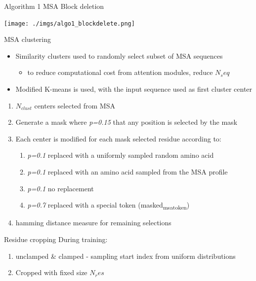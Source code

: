 \documentclass[presentation, smaller]{beamer}
\begin{document}
\begin{frame}[label={sec:org2d4be19}]{Algorithm 1 MSA Block deletion \cite{jumperHighlyAccurateProtein2021}}
\begin{center}
\texttt{[image: ./imgs/algo1\_blockdelete.png]}
\end{center}
\end{frame}
\begin{frame}[label={sec:org5a180d7}]{MSA clustering \cite{jumperHighlyAccurateProtein2021}}
\begin{itemize}
\item Similarity clusters used to randomly select subset of MSA sequences 
\begin{itemize}
\item to reduce computational cost from attention modules, reduce \(N_seq\)
\end{itemize}
\item Modified K-means is used, with the input sequence used as first cluster center
\end{itemize}


\begin{enumerate}
\item \(N_{clust}\) centers selected from MSA
\item Generate a mask where \emph{p=0.15} that any position is selected by the mask
\item Each center is modified for each mask selected residue according to:
\begin{enumerate}
\item \emph{p=0.1} replaced with a uniformly sampled random amino acid
\item \emph{p=0.1} replaced with an amino acid sampled from the MSA profile
\item \emph{p=0.1} no replacement
\item \emph{p=0.7} replaced with a special token (masked\textsubscript{msa}\textsubscript{token})
\end{enumerate}
\item hamming distance measure for remaining selections
\end{enumerate}
\end{frame}

\begin{frame}[label={sec:org1a70f60}]{Residue cropping \cite{jumperHighlyAccurateProtein2021}}
During training:
\begin{enumerate}
\item unclamped \& clamped - sampling start index from uniform distributions
\item Cropped with fixed size \(N_res\)
\end{enumerate}
\end{frame}
\end{document}
